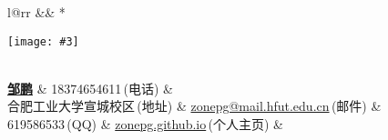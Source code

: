 \newcommand{\paint}[3]{
  \begin{minipage}{#1}
    \texttt{[image: \#3]}
  \end{minipage}
}
\newcommand{\myheader}{
  \begin{tabular*}{\textwidth}{l@{\extracolsep{\fill}}rr}
    && \multirow{4}*{\paint{2.2cm}{3.2cm}{./image.jpg}}\\
    \specialrule{0em}{4pt}{4pt}
    \textbf{\href{http://zonepg.github.io}{\LARGE 邹鹏}} & 18374654611$\,${\color{labelgrey}(电话)} &\\
    合肥工业大学宣城校区$\,${\color{labelgrey}(地址)} & \href{mailto:zhangzc@pku.edu.cn}{zonepg@mail.hfut.edu.cn}$\,${\color{labelgrey}(邮件)} & \\
    619586533$\,${\color{labelgrey}(QQ)} & \href{http://zonepg.github.io}{zonepg.github.io}$\,${\color{labelgrey}(个人主页)} & \\
  \end{tabular*}\\\vspace{0.1in}
}

\myheader

